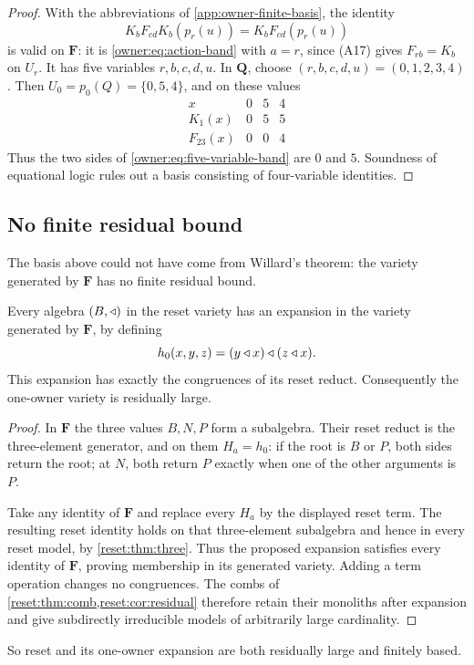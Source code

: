 \begin{proof}
With the abbreviations of \cref{app:owner-finite-basis}, the identity
\begin{equation}\label{owner:eq:five-variable-band}
 K_bF_{cd}K_b(p_r(u))=K_bF_{cd}(p_r(u))
\end{equation}
is valid on $\mathbf F$: it is \eqref{owner:eq:action-band} with $a=r$, since (A17) gives
$F_{rb}=K_b$ on $U_r$.
It has five variables $r,b,c,d,u$.
In $\mathbf Q$, choose $(r,b,c,d,u)=(0,1,2,3,4)$.
Then $U_0=p_0(Q)=\{0,5,4\}$, and on these values
\[
 \begin{array}{c|ccc}
 x&0&5&4\\\hline
 K_1(x)&0&5&5\\
 F_{23}(x)&0&0&4
 \end{array}
\]
Thus the two sides of \eqref{owner:eq:five-variable-band} are $0$ and $5$.
Soundness of equational logic rules out a basis consisting of
four-variable identities.
\end{proof}

\subsection{No finite residual bound}

The basis above could not have come from Willard's theorem: the variety
generated by $\mathbf F$ has no finite residual bound.

\begin{proposition}
\label{owner:prop:residual}
Every algebra $(B,\mathbin{\triangleleft})$ in the reset variety has an expansion in the
variety generated by $\mathbf F$, by defining
\[
 h_0(x,y,z)=(y\mathbin{\triangleleft} x)\mathbin{\triangleleft}(z\mathbin{\triangleleft} x).
\]
This expansion has exactly the congruences of its reset reduct.
Consequently the one-owner variety is residually large.
\end{proposition}
\begin{proof}
In $\mathbf F$ the three values $B,N,P$ form a subalgebra. Their
reset reduct is the three-element generator, and on them
$H_a=h_0$: if the root is $B$ or $P$, both sides return the root;
at $N$, both return $P$ exactly when one of the other arguments is
$P$.

Take any identity of $\mathbf F$ and replace every $H_a$ by the
displayed reset term. The resulting reset identity holds on that
three-element subalgebra and hence in every reset model, by
\cref{reset:thm:three}. Thus the proposed expansion satisfies every
identity of $\mathbf F$, proving membership in its generated variety.
Adding a term operation changes no congruences. The combs of
\cref{reset:thm:comb,reset:cor:residual} therefore retain their
monoliths after expansion and give subdirectly irreducible models of
arbitrarily large cardinality.
\end{proof}

So reset and its one-owner expansion are both residually large and finitely
based.
